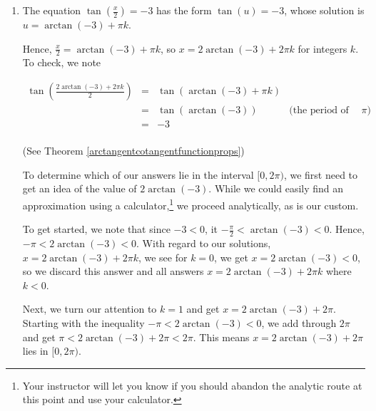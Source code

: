 \documentclass{ximera}
\begin{document}
\begin{example}
\begin{explanation}
\begin{enumerate}
The check for the family of solutions $t =\frac{2\pi}{3} + \pi k$ is similar. 

 

 The solutions which lie in $[0,2\pi)$ come from the values $k = 0$ and $k=1$, namely $t = \frac{\pi}{3}$, $\frac{2\pi}{3}$, $\frac{4\pi}{3}$ and $\frac{5\pi}{3}$.  Graphing $y = (\sec(t))^2$ and $y=4$ confirms our results.  

\begin{center}
\end{center}

\item  The equation  $\tan\left(\frac{x}{2}\right) = -3$ has the form $\tan(u) = -3$, whose solution is $u = \arctan(-3) + \pi k$.  

 

Hence, $\frac{x}{2} = \arctan(-3) + \pi k$, so  $x = 2\arctan(-3) + 2\pi k$ for integers $k$.  To check, we note

\[ \begin{array}{rclr}

\tan\left(\frac{2\arctan(-3) + 2\pi k}{2}\right)  &  = & \tan\left( \arctan(-3) + \pi k \right)  & \\   
& =  & \tan\left(\arctan(-3) \right) & \text{(the period of tangent is $\pi$)} \\   
& =  & -3 & \\
	
\end{array}\] 

(See Theorem \ref{arctangentcotangentfunctionprops}) 

 To determine which of our answers lie in the interval $[0,2\pi)$, we first need to get an idea of the value of $2\arctan(-3)$.  While we could easily find an approximation using a calculator,\footnote{Your instructor will let you know if you should abandon the analytic route at this point and use your calculator.} we proceed analytically, as is our custom.
 
  
 
To get started, we note that since $-3 < 0$, it  $-\frac{\pi}{2} < \arctan(-3) < 0$.  Hence,  $-\pi < 2\arctan(-3) < 0$.   With regard to our solutions,  $x = 2\arctan(-3) + 2\pi k$, we see for $k = 0$, we get $x = 2\arctan(-3) < 0$, so we discard this answer and all answers $x = 2\arctan(-3) + 2\pi k$ where $k < 0$.  

 

Next, we turn our attention to $k = 1$ and get $x = 2\arctan(-3) + 2\pi$. Starting with the inequality $-\pi < 2\arctan(-3) < 0$, we add through $2\pi$  and get $\pi < 2\arctan(-3) +2\pi < 2\pi$.  This means $x = 2\arctan(-3) + 2\pi$ lies in $[0,2\pi)$.  


\end{enumerate}
\end{explanation}
\end{example}
\end{document}
